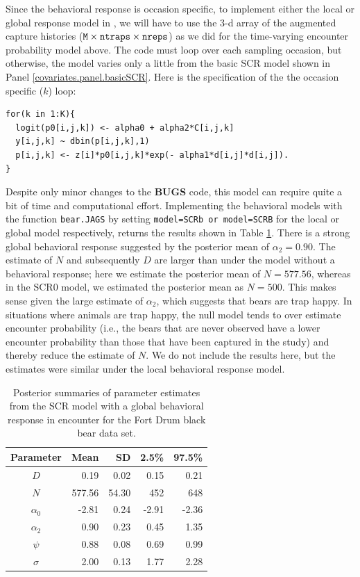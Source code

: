 Since the behavioral response is occasion specific, to implement either the local or global 
response model in \jags, we will have to use the 3-d array of the augmented
capture histories ($\mbox{\tt M} \times \mbox{\tt ntraps} \times
\mbox{\tt nreps}$) as we did for the time-varying encounter probability
model above. The code must loop over each sampling occasion, but otherwise, the model
varies only a little from the basic SCR model shown in Panel \ref{covariates.panel.basicSCR}.  
Here is the specification of the the occasion specific ($k$) loop:
{\small
\begin{verbatim}
for(k in 1:K){
  logit(p0[i,j,k]) <- alpha0 + alpha2*C[i,j,k]
  y[i,j,k] ~ dbin(p[i,j,k],1)
  p[i,j,k] <- z[i]*p0[i,j,k]*exp(- alpha1*d[i,j]*d[i,j]).
}
\end{verbatim}
}

Despite only minor changes to the {\bf BUGS} code, this model can
require quite a bit of time and computational effort.  
Implementing the behavioral models with the
function {\tt bear.JAGS} by setting {\tt model=SCRb or model=SCRB} for
the local or global model respectively, returns the results shown in
Table \ref{covariates.tab.SCRb}.  There is a strong global behavioral
response suggested by the posterior mean of $\alpha_2 = 0.90$.  The
estimate of $N$ and subsequently $D$ are larger than under the model
without a behavioral response; here we estimate the posterior mean of $N = 577.56$,
 whereas in the
SCR0 model, we estimated the posterior mean as $N = 500$.  
This makes sense given the large
estimate of $\alpha_2$, which suggests that bears are trap happy.  In
situations where animals are trap happy, the null model tends to over
estimate encounter probability (i.e., the bears that are never
observed have a lower encounter probability than those that have been
captured in the study) and thereby reduce the estimate of $N$.  We do
not include the results here, but the estimates were similar under the
local behavioral response model.

\begin{table}[ht]
\centering
\caption{Posterior summaries of parameter estimates from the SCR model with a 
global behavioral response in encounter for the Fort Drum black bear data set.}
\begin{tabular}{crrrr}
\hline \hline
Parameter & Mean & SD & 2.5\% & 97.5\% \\
\hline
$D$           &    0.19     &  0.02    & 0.15 & 0.21 \\
$N$           &   577.56 &  54.30  & 452  & 648  \\
$\alpha_0$  &    -2.81     & 0.24    & -2.91  & -2.36  \\
$\alpha_2$  & 0.90  &  0.23   & 0.45  &  1.35 \\
$\psi$  &   0.88 &  0.08  &  0.69 & 0.99  \\
$\sigma$ & 2.00 &  0.13  &   1.77 & 2.28  \\ \hline
\end{tabular}
\label{covariates.tab.SCRb}
\end{table}


